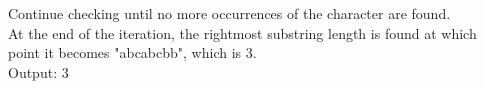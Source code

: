 \documentclass[preview]{standalone}
\begin{document}
Continue checking until no more occurrences of the character are found.\\At the end of the iteration, the rightmost substring length is found at which point it becomes "abcabcbb", which is 3.\\Output: 3\\
\end{document}
